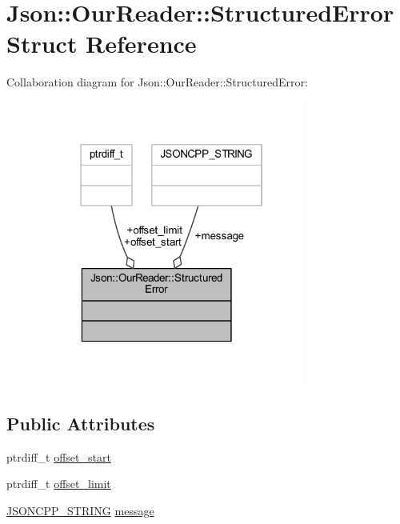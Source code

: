 \hypertarget{struct_json_1_1_our_reader_1_1_structured_error}{}\section{Json\+:\+:Our\+Reader\+:\+:Structured\+Error Struct Reference}
\label{struct_json_1_1_our_reader_1_1_structured_error}


Collaboration diagram for Json\+:\+:Our\+Reader\+:\+:Structured\+Error\+:\nopagebreak
\begin{figure}[H]
\begin{center}
\leavevmode
\includegraphics[width=250pt]{struct_json_1_1_our_reader_1_1_structured_error__coll__graph}
\end{center}
\end{figure}
\subsection*{Public Attributes}
\begin{DoxyCompactItemize}
\item 
ptrdiff\+\_\+t \hyperlink{struct_json_1_1_our_reader_1_1_structured_error_a102677698afb8177c985e72dafe72b15}{offset\+\_\+start}
\item 
ptrdiff\+\_\+t \hyperlink{struct_json_1_1_our_reader_1_1_structured_error_a15491a751a39c5153af04e68b1d0abb9}{offset\+\_\+limit}
\item 
\hyperlink{json_8h_a1e723f95759de062585bc4a8fd3fa4be}{J\+S\+O\+N\+C\+P\+P\+\_\+\+S\+T\+R\+I\+NG} \hyperlink{struct_json_1_1_our_reader_1_1_structured_error_a9d0b9986bf765d067dfcf2f971a450d1}{message}
\end{DoxyCompactItemize}



